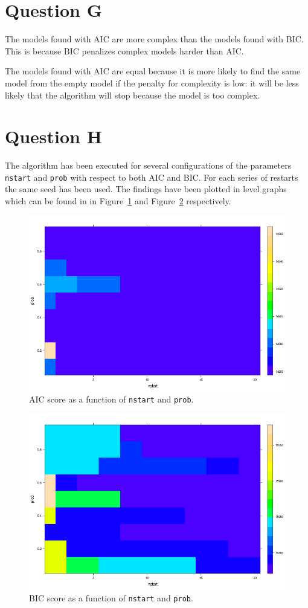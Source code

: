 \documentclass[12pt]{article}
\theoremstyle{definition}
\begin{document}

\section*{Question G}
The models found with AIC are more complex than the models found with BIC.
This is because BIC penalizes complex models harder than AIC.

The models found with AIC are equal because it is more likely to find the
same model from the empty model if the penalty for complexity is low: it will
be less likely that the algorithm will stop because the model is too complex.

\section*{Question H}
The algorithm has been executed for several configurations of the parameters \texttt{nstart} and \texttt{prob} with respect to both AIC and BIC.
For each series of restarts the same seed has been used.
The findings have been plotted in level graphs which can be found in in Figure~\ref{fig:aic_plot} and Figure~\ref{fig:bic_plot} respectively.

\begin{figure}[H]
    \centering
    \includegraphics[width=0.8\linewidth]{aic_plot.png}
    \caption{AIC score as a function of \texttt{nstart} and \texttt{prob}.}
\label{fig:aic_plot}
\end{figure}

\begin{figure}[H]
    \centering
    \includegraphics[width=0.8\linewidth]{bic_plot.png}
    \caption{BIC score as a function of \texttt{nstart} and \texttt{prob}.}
\label{fig:bic_plot}
\end{figure}
\end{document}
